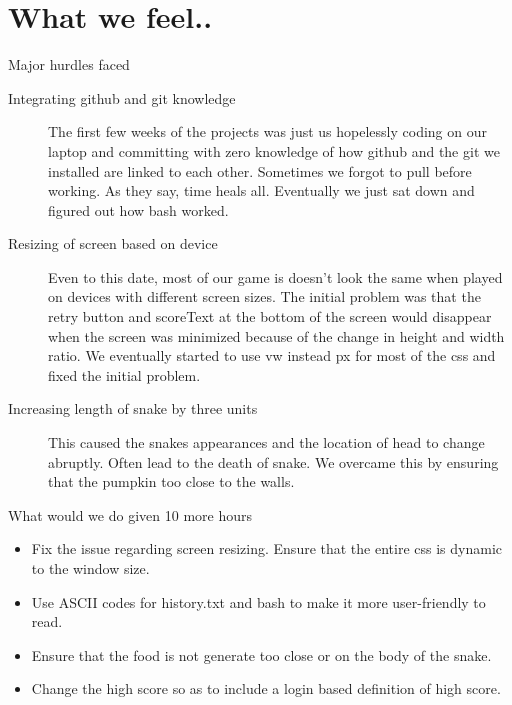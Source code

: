 \documentclass[12pt, letterpaper]{article}
\begin{document}
\section{What we feel..}
Major hurdles faced
\begin{description}
    \item[Integrating github and git knowledge] The first few weeks of the projects was just us hopelessly coding on our laptop and committing with zero knowledge of how github and the git we installed are linked to each other. Sometimes we forgot to pull before working. As they say, time heals all. Eventually we just sat down and figured out how bash worked.
    \item[Resizing of screen based on device] Even to this date, most of our game is doesn't look the same when played on devices with different screen sizes. The initial problem was that the retry button and scoreText at the bottom of the screen would disappear when the screen was minimized because of the change in height and width ratio. We eventually started to use vw instead px for most of the css and fixed the initial problem.
    \item[Increasing length of snake by three units] This caused the snakes appearances and the location of head to change abruptly. Often lead to the death of snake. We overcame this by ensuring that the pumpkin too close to the walls.
\end{description}

What would we do given 10 more hours
\begin{itemize}
    \item Fix the issue regarding screen resizing. Ensure that the entire css is dynamic to the window size.
    \item Use ASCII codes for history.txt and bash to make it more user-friendly to read.
    \item Ensure that the food is not generate too close or on the body of the snake.
    \item Change the high score so as to include a login based definition of high score.
\end{itemize}


\end{document}
